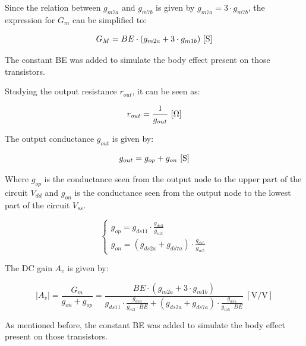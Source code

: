 Since the relation between $g_{m7a}$ and $g_{m7b}$ is given by $g_{m7a} = 3 \cdot g_{m7b}$, the expression for $G_m$ can be simplified to:  

\begin{equation}
    G_M = BE \cdot (g_{m2a} + 3 \cdot g_{m1b}) \ [\si{\siemens}] \\
    \label{eq:GM_BE}
\end{equation}

The constant BE was added to simulate the body effect present on those transistors.

Studying the output resistance $r_{out}$, it can be seen as:

\begin{equation}
    r_{out} = \frac{1}{g_{out}} \ [\Omega] \\
    \label{eq:rout}
\end{equation}

The output conductance $g_{out}$ is given by:

\begin{equation}
    g_{out} = g_{op} + g_{on} \ [\si{\siemens}] \\
    \label{eq:gout}
\end{equation}

Where $g_{op}$ is the conductance seen from the output node to the upper part of the circuit $V_{dd}$ and $g_{on}$ is the conductance seen from the output node to the lowest part of the circuit $V_{ss}$.

\begin{equation}
    \begin{cases}
        g_{op} = g_{ds11} \cdot \frac{g_{ds3}}{g_{m3}} \\
        g_{on} = \left( g_{ds2a} + g_{ds7a} \right) \cdot \frac{g_{ds5}}{g_{m5}}
    \end{cases}
    \label{eq:output_conductance}
\end{equation}

The DC gain $A_v$ is given by:

\begin{equation}
    |A_v| = \frac{G_m}{g_{on} + g_{op}} = \frac{BE \cdot (g_{m2a} + 3 \cdot g_{m1b})}{g_{ds11} \cdot \frac{g_{ds3}}{g_{m3}\cdot BE} + (g_{ds2a} + g_{ds7a}) \cdot \frac{g_{ds5}}{g_{m5} \cdot BE}} \ [\si{\volt/\volt}]
    \label{eq:Av}
\end{equation}

As mentioned before, the constant BE was added to simulate the body effect present on those transistors.

